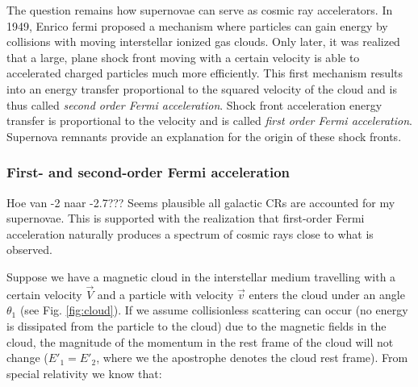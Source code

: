 The question remains how supernovae can serve as cosmic ray accelerators. In 1949, Enrico fermi proposed a mechanism where particles can gain energy by collisions with moving interstellar ionized gas clouds. Only later, it was realized that a large, plane shock front moving with a certain velocity is able to accelerated charged particles much more efficiently. This first mechanism results into an energy transfer proportional to the squared velocity of the cloud and is thus called \textit{second order Fermi acceleration}. Shock front acceleration energy transfer is proportional to the velocity and is called \textit{first order Fermi acceleration}. Supernova remnants provide an explanation for the origin of these shock fronts.


\subsubsection{First- and second-order Fermi acceleration}
\label{subsubsec:fermiacceleration}

Hoe van -2 naar -2.7???
Seems plausible all galactic CRs are accounted for my supernovae. This is supported with the realization that first-order Fermi acceleration naturally produces a spectrum of cosmic rays close to what is observed.

Suppose we have a magnetic cloud in the interstellar medium travelling with a certain velocity $\vec{V}$ and a particle with velocity $\vec{v}$ enters the cloud under an angle $\theta_1$ (see Fig. \ref{fig:cloud}). If we assume collisionless scattering can occur (no energy is dissipated from the particle to the cloud) due to the magnetic fields in the cloud, the magnitude of the momentum in the rest frame of the cloud will not change ($E'_1 = E'_2$, where we the apostrophe denotes the cloud rest frame). From special relativity we know that:

